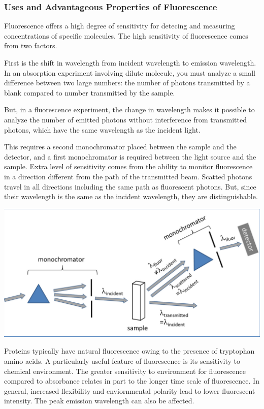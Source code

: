 \documentclass[12pt, letterpaper]{article}
\begin{document}
\subsubsection*{Uses and Advantageous Properties of Fluorescence}
Fluorescence offers a high degree of sensitivity for detecing and measuring concentrations of specific molecules. 
The high sensitivity of fluorescence comes from two factors. 

First is the shift in wavelength from incident wavelength to emission wavelength. In an absorption experiment involving 
dilute molecule, you must analyze a small difference between two large numbers: the number of photons transmitted by a blank compared to 
number transmitted by the sample. 

But, in a fluorescence experiment, the change in wavelength makes it possible to analyze the number of emitted photons without interference from 
transmitted photons, which have the same wavelength as the incident light. 

\newpage

This requires a second monochromator placed between the sample and the detector, and a first monochromator is required between the light source and the sample. 
Extra level of sensitivity comes from the ability to monitor fluorescence in a direction different from the path of the transmitted beam. Scatted photons travel in all directions
including the same path as fluorescent photons. But, since their wavelength is the same as the incident wavelength, they are distinguishable. 

\begin{center}
    \includegraphics[scale = 0.35]{fluorescence experiment.png}
\end{center}

Proteins typically have natural fluorescence owing to the presence of tryptophan amino acids. A particularly useful feature of fluorescence is its 
sensitivity to chemical environment. The greater sensitivity to environment for fluorescence compared to absorbance relates in part to the longer time 
scale of fluorescence. In general, increased flexibility and enviornmental polarity lead to lower fluorescent intensity. The peak emission wavelength can also 
be affected. 
\end{document}
